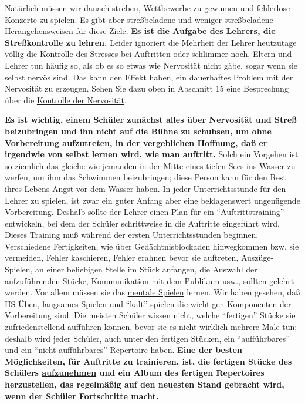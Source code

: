 Natürlich müssen wir danach streben, Wettbewerbe zu gewinnen und fehlerlose Konzerte zu spielen.
Es gibt aber streßbeladene und weniger streßbeladene Herangehensweisen für diese Ziele.
\textbf{Es ist die Aufgabe des Lehrers, die Streßkontrolle zu lehren.}
Leider ignoriert die Mehrheit der Lehrer heutzutage völlig die Kontrolle des Stresses bei Auftritten oder schlimmer noch, Eltern und Lehrer tun häufig so, als ob es so etwas wie Nervosität nicht gäbe, sogar wenn sie selbst nervös sind.
Das kann den Effekt haben, ein dauerhaftes Problem mit der Nervosität zu erzeugen.
Sehen Sie dazu oben in Abschnitt 15 eine Besprechung über die \hyperref[c1iii15]{Kontrolle der Nervosität}.

\textbf{Es ist wichtig, einem Schüler zunächst alles über Nervosität und Streß beizubringen und
ihn nicht auf die Bühne zu schubsen, um ohne Vorbereitung aufzutreten, in der vergeblichen Hoffnung, daß er irgendwie von selbst lernen wird, wie man auftritt.}
Solch ein Vorgehen ist so ziemlich das gleiche wie jemanden in der Mitte eines tiefen Sees ins Wasser zu werfen, um ihm das Schwimmen beizubringen; diese Person kann für den Rest ihres Lebens Angst vor dem Wasser haben.
In jeder Unterrichtsstunde für den Lehrer zu spielen, ist zwar ein guter Anfang aber eine beklagenswert ungenügende Vorbereitung.
Deshalb sollte der Lehrer einen Plan für ein \enquote{Auftrittstraining} entwickeln, bei dem der Schüler schrittweise in die Auftritte eingeführt wird.
Dieses Training muß während der ersten Unterrichtsstunden beginnen.
Verschiedene Fertigkeiten, wie über Gedächtnisblockaden hinwegkommen bzw. sie vermeiden, Fehler kaschieren, Fehler erahnen bevor sie auftreten, Auszüge-Spielen, an einer beliebigen Stelle im Stück anfangen, die Auswahl der aufzuführenden Stücke, Kommunikation mit dem Publikum usw., sollten gelehrt werden.
Vor allem müssen sie das \hyperref[c1ii12mental]{mentale Spielen} lernen.
Wir haben gesehen, daß HS-Üben, \hyperref[c1ii17]{langsames Spielen} und \hyperref[c1iii6g]{\enquote{kalt} spielen} die wichtigen Komponenten der Vorbereitung sind.
Die meisten Schüler wissen nicht, welche \enquote{fertigen} Stücke sie zufriedenstellend aufführen können, bevor sie es nicht wirklich mehrere Male tun; deshalb wird jeder Schüler, auch unter den fertigen Stücken, ein \enquote{aufführbares} und ein \enquote{nicht aufführbares} Repertoire haben.
\textbf{Eine der besten Möglichkeiten, für Auftritte zu trainieren, ist, die fertigen Stücke des Schülers \hyperref[c1iii13]{aufzunehmen} und ein Album des fertigen Repertoires herzustellen, das regelmäßig auf den neuesten Stand gebracht wird, wenn der Schüler Fortschritte macht.}
